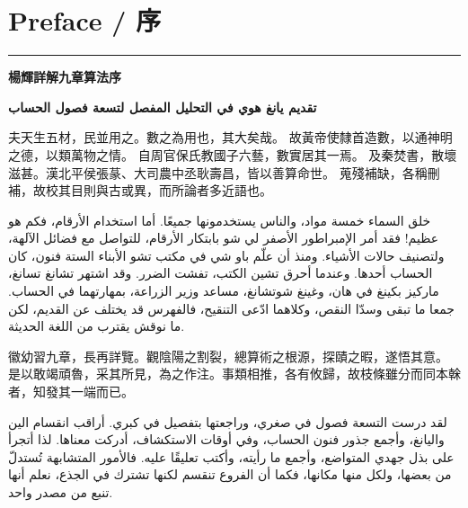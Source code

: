 \documentclass[11pt,a4paper]{article}
\newcommand{\ar}[1]{\arabicfont\beginR #1\endR}
\newcommand{\bilingualrow}[2]{%
\noindent\begin{minipage}[t]{0.48\textwidth}#1\end{minipage}\hfill\begin{minipage}[t]{0.48\textwidth}\arabicfont\beginR #2\endR\end{minipage}\par\vspace{0.5cm}}
\begin{document}
\section*{Preface / 序}

\begin{center}
\rule{0.5\textwidth}{0.4pt}
\end{center}

\noindent
\begin{minipage}[t]{0.46\textwidth}
\begin{flushleft}
{\large\bfseries\color{titlecolor} 楊輝詳解九章算法序}
\end{flushleft}
\end{minipage}%
\hfill%
\begin{minipage}[t]{0.46\textwidth}
\begin{flushright}
{\large\bfseries\color{titlecolor} \ar{تقديم يانغ هوي في التحليل المفصل لتسعة فصول الحساب}}
\end{flushright}
\end{minipage}

\vspace{1em}

\bilingualrow{
夫天生五材，民並用之。數之為用也，其大矣哉。
故黃帝使隸首造數，以通神明之德，以類萬物之情。
自周官保氏教國子六藝，數實居其一焉。
及秦焚書，散壞滋甚。漢北平侯張蒃、大司農中丞耿壽昌，皆以善算命世。
蒐殘補缺，各稱刪補，故校其目則與古或異，而所論者多近語也。
}{
خلق السماء خمسة مواد، والناس يستخدمونها جميعًا. أما استخدام الأرقام، فكم هو عظيم!
فقد أمر الإمبراطور الأصفر لي شو بابتكار الأرقام، للتواصل مع فضائل الآلهة، ولتصنيف حالات الأشياء.
ومنذ أن علّم باو شي في مكتب تشو الأبناء الستة فنون، كان الحساب أحدها.
وعندما أحرق تشين الكتب، تفشت الضرر. وقد اشتهر تشانغ تسانغ، ماركيز بكينغ في هان، وغينغ شوتشانغ، مساعد وزير الزراعة، بمهارتهما في الحساب.
جمعا ما تبقى وسدّا النقص، وكلاهما ادّعى التنقيح، فالفهرس قد يختلف عن القديم، لكن ما نوقش يقترب من اللغة الحديثة.
}

\bilingualrow{
徽幼習九章，長再詳覽。觀陰陽之割裂，總算術之根源，探賾之暇，遂悟其意。
是以敢竭頑魯，采其所見，為之作注。事類相推，各有攸歸，故枝條雖分而同本榦者，知發其一端而已。
}{
لقد درست التسعة فصول في صغري، وراجعتها بتفصيل في كبري. أراقب انقسام الين واليانغ، وأجمع جذور فنون الحساب، وفي أوقات الاستكشاف، أدركت معناها.
لذا أتجرأ على بذل جهدي المتواضع، وأجمع ما رأيته، وأكتب تعليقًا عليه. فالأمور المتشابهة تُستدلّ من بعضها، ولكل منها مكانها، فكما أن الفروع تنقسم لكنها تشترك في الجذع، نعلم أنها تنبع من مصدر واحد.
}
\end{document}
